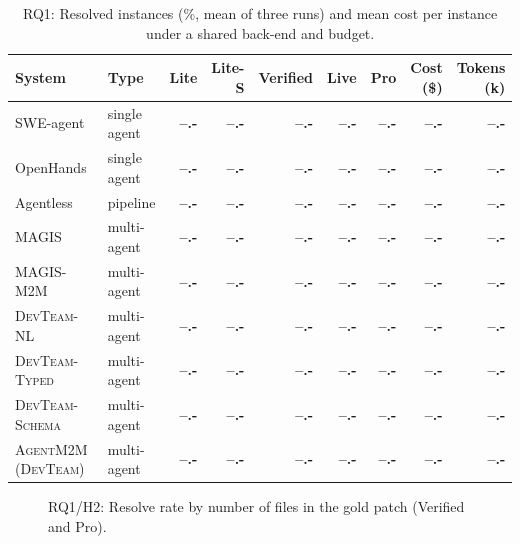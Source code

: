 \documentclass[10pt, anonymous, conference]{IEEEtran}
\theoremstyle{definition}
\theoremstyle{plain}
\theoremstyle{remark}
\newcommand{\tool}{\textsc{AgentM2M}}
\newcommand{\devteam}{\textsc{DevTeam}}
\newcommand{\ph}{{\color{red}\textbf{--.-}}}     %
\newif\ifplaceholderdata \placeholderdatatrue     %
\newcommand{\phwatermark}{\ifplaceholderdata
  \node[red, opacity=0.55, font=\bfseries\scriptsize, rotate=12]
  at (rel axis cs:0.5,0.55) {PLACEHOLDER DATA};\fi}
\begin{document}
\begin{table}[t]
\centering
\caption{RQ1: Resolved instances (\%, mean of three runs) and mean cost per
instance under a shared back-end and budget.}
\label{tab:main}
\footnotesize
\begin{tabular}{@{}l l r r r r r r r@{}}
\toprule
System & Type & Lite & Lite-S & Verified & Live & Pro & Cost (\$) & Tokens (k) \\
\midrule
SWE-agent~\cite{yang2024sweagent}  & single agent & \ph & \ph & \ph & \ph & \ph & \ph & \ph \\
OpenHands~\cite{wang2025openhands} & single agent & \ph & \ph & \ph & \ph & \ph & \ph & \ph \\
Agentless~\cite{xia2025agentless}  & pipeline     & \ph & \ph & \ph & \ph & \ph & \ph & \ph \\
MAGIS~\cite{tao2024magis}          & multi-agent  & \ph & \ph & \ph & \ph & \ph & \ph & \ph \\
\textsc{MAGIS-M2M}                 & multi-agent  & \ph & \ph & \ph & \ph & \ph & \ph & \ph \\
\textsc{DevTeam-NL}                & multi-agent  & \ph & \ph & \ph & \ph & \ph & \ph & \ph \\
\textsc{DevTeam-Typed}             & multi-agent  & \ph & \ph & \ph & \ph & \ph & \ph & \ph \\
\textsc{DevTeam-Schema}            & multi-agent  & \ph & \ph & \ph & \ph & \ph & \ph & \ph \\
\midrule
\tool{} (\devteam{})               & multi-agent  & \ph & \ph & \ph & \ph & \ph & \ph & \ph \\
\bottomrule
\end{tabular}
\end{table}

\begin{figure}[t]
\centering
{}
\caption{RQ1/H2: Resolve rate by number of files in the gold patch
(Verified and Pro).}
\label{fig:byfiles}
\end{figure}
\end{document}
